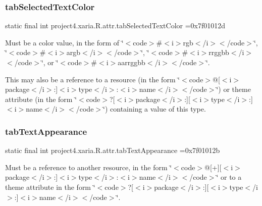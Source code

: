 \subsubsection{\texorpdfstring{tab\+Selected\+Text\+Color}{tabSelectedTextColor}}
{\footnotesize\ttfamily static final int project4.\+xaria.\+R.\+attr.\+tab\+Selected\+Text\+Color =0x7f01012d\hspace{0.3cm}{\ttfamily [static]}}

Must be a color value, in the form of \char`\"{}$<$code$>$\#$<$i$>$rgb$<$/i$>$$<$/code$>$\char`\"{}, \char`\"{}$<$code$>$\#$<$i$>$argb$<$/i$>$$<$/code$>$\char`\"{}, \char`\"{}$<$code$>$\#$<$i$>$rrggbb$<$/i$>$$<$/code$>$\char`\"{}, or \char`\"{}$<$code$>$\#$<$i$>$aarrggbb$<$/i$>$$<$/code$>$\char`\"{}. 

This may also be a reference to a resource (in the form \char`\"{}$<$code$>$@\mbox{[}$<$i$>$package$<$/i$>$\+:\mbox{]}$<$i$>$type$<$/i$>$\+:$<$i$>$name$<$/i$>$$<$/code$>$\char`\"{}) or theme attribute (in the form \char`\"{}$<$code$>$?\mbox{[}$<$i$>$package$<$/i$>$\+:\mbox{]}\mbox{[}$<$i$>$type$<$/i$>$\+:\mbox{]}$<$i$>$name$<$/i$>$$<$/code$>$\char`\"{}) containing a value of this type. \mbox{\label{classproject4_1_1xaria_1_1R_1_1attr_a9bf69fa8a1e6aca25653efea0178b3ef}} 
\subsubsection{\texorpdfstring{tab\+Text\+Appearance}{tabTextAppearance}}
{\footnotesize\ttfamily static final int project4.\+xaria.\+R.\+attr.\+tab\+Text\+Appearance =0x7f01012b\hspace{0.3cm}{\ttfamily [static]}}

Must be a reference to another resource, in the form \char`\"{}$<$code$>$@\mbox{[}+\mbox{]}\mbox{[}$<$i$>$package$<$/i$>$\+:\mbox{]}$<$i$>$type$<$/i$>$\+:$<$i$>$name$<$/i$>$$<$/code$>$\char`\"{} or to a theme attribute in the form \char`\"{}$<$code$>$?\mbox{[}$<$i$>$package$<$/i$>$\+:\mbox{]}\mbox{[}$<$i$>$type$<$/i$>$\+:\mbox{]}$<$i$>$name$<$/i$>$$<$/code$>$\char`\"{}. \mbox{\label{classproject4_1_1xaria_1_1R_1_1attr_a0ac7d6c65606e809217e5f2058477ed5}} 
